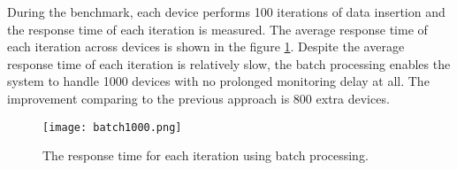 \documentclass[../thesis.tex]{subfiles}
\begin{document}
During the benchmark, each device performs 100 iterations of data insertion and the response time of each iteration is measured. The average response time of each iteration across devices is shown in the figure \ref{fig:batch}. Despite the average response time of each iteration is relatively slow, the batch processing enables the system to handle 1000 devices with no prolonged monitoring delay at all. The improvement comparing to the previous approach is 800 extra devices. 

\begin{figure}[!ht]
	\centering
	\texttt{[image: batch1000.png]}
	\caption{The response time for each iteration using batch processing.}
	\label{fig:batch}
\end{figure}
\end{document}
